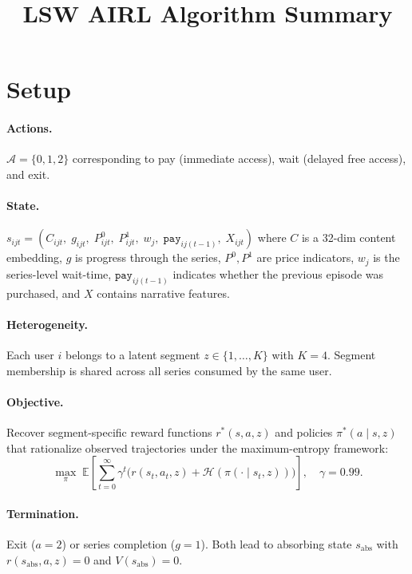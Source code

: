 \documentclass[11pt]{article}
\title{LSW AIRL Algorithm Summary}
\author{}
\date{}
\begin{document}
\maketitle
\vspace{-1.5em}

\section*{Setup}

\paragraph{Actions.} $\mathcal{A} = \{0, 1, 2\}$ corresponding to pay (immediate access), wait (delayed free access), and exit.

\paragraph{State.} $s_{ijt} = (C_{ijt},\; g_{ijt},\; P^0_{ijt},\; P^1_{ijt},\; w_j,\; \texttt{pay}_{ij(t-1)},\; X_{ijt})$ where $C$ is a 32-dim content embedding, $g$ is progress through the series, $P^0, P^1$ are price indicators, $w_j$ is the series-level wait-time, $\texttt{pay}_{ij(t-1)}$ indicates whether the previous episode was purchased, and $X$ contains narrative features.

\paragraph{Heterogeneity.} Each user $i$ belongs to a latent segment $z \in \{1, \ldots, K\}$ with $K = 4$. Segment membership is shared across all series consumed by the same user.

\paragraph{Objective.} Recover segment-specific reward functions $r^*(s, a, z)$ and policies $\pi^*(a \mid s, z)$ that rationalize observed trajectories under the maximum-entropy framework:
\[
\max_\pi \; \mathbb{E}\!\left[\sum_{t=0}^{\infty} \gamma^t \big(r(s_t, a_t, z) + \mathcal{H}(\pi(\cdot \mid s_t, z))\big)\right], \quad \gamma = 0.99.
\]

\vspace{-0.5em}
\paragraph{Termination.} Exit ($a = 2$) or series completion ($g = 1$). Both lead to absorbing state $s_{\text{abs}}$ with $r(s_{\text{abs}}, a, z) = 0$ and $V(s_{\text{abs}}) = 0$.
\end{document}
